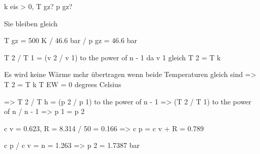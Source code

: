 k eis > 0, T gz? p gz?

Sie bleiben gleich

T gz = 500 K / 46.6 bar / p gz = 46.6 bar

T 2 / T 1 = (v 2 / v 1) to the power of n - 1 da v 1 gleich T 2 = T k

Es wird keine Wärme mehr übertragen wenn beide Temperaturen gleich sind => T 2 = T k T EW = 0 degrees Celsius

=> T 2 / T h = (p 2 / p 1) to the power of n - 1 => (T 2 / T 1) to the power of n / n - 1 => p 1 = p 2

c v = 0.623, R = 8.314 / 50 = 0.166 => c p = c v + R = 0.789

c p / c v = n = 1.263 => p 2 = 1.7387 bar